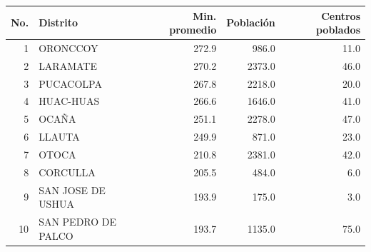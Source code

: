 \begin{tabular}{rlrrr}
\toprule
No. & Distrito & Min. promedio & Población & Centros poblados \\
\midrule
1 & ORONCCOY & 272.9 & 986.0 & 11.0 \\
2 & LARAMATE & 270.2 & 2373.0 & 46.0 \\
3 & PUCACOLPA & 267.8 & 2218.0 & 20.0 \\
4 & HUAC-HUAS & 266.6 & 1646.0 & 41.0 \\
5 & OCAÑA & 251.1 & 2278.0 & 47.0 \\
6 & LLAUTA & 249.9 & 871.0 & 23.0 \\
7 & OTOCA & 210.8 & 2381.0 & 42.0 \\
8 & CORCULLA & 205.5 & 484.0 & 6.0 \\
9 & SAN JOSE DE USHUA & 193.9 & 175.0 & 3.0 \\
10 & SAN PEDRO DE PALCO & 193.7 & 1135.0 & 75.0 \\
\bottomrule
\end{tabular}
